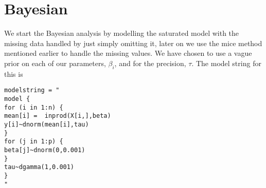 \documentclass{article}
\begin{document}
\section{Bayesian}
We start the Bayesian analysis by modelling the saturated model with the missing data handled by just simply omitting it, later on we use the mice method mentioned earlier to handle the missing values. We have chosen to use a vague prior on each of our parameters, $\beta_i$, and for the precision, $\tau$. The model string  for this is 
\begin{verbatim}
modelstring = "
model {
for (i in 1:n) {
mean[i] =  inprod(X[i,],beta)
y[i]~dnorm(mean[i],tau)
}
for (j in 1:p) {
beta[j]~dnorm(0,0.001)
}
tau~dgamma(1,0.001)
}
"
\end{verbatim}
\end{document}
